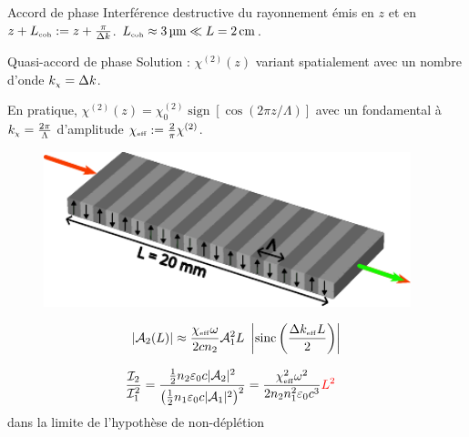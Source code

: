 \documentclass{beamer}
\newcommand{\chie}{\chi_\mathsc{eff}}
\newcommand{\dke}{\Delta k_\mathsc{eff}}
\begin{document}
\begin{frame}{Accord de phase}
Interférence destructive du rayonnement émis en $z$ et en  $z+L_{\mathrm{\scriptscriptstyle {coh}}} := z + \frac{\pi}{\Delta k}$. $L_{\mathrm{\scriptscriptstyle {coh}}} \approx \SI{3}{\micro\meter} \ll L = \SI{2}{cm}$.
\begin{figure}
\centering

\end{figure}
\end{frame}

\begin{frame}{Quasi-accord de phase}
Solution : $\chi^{(2)}(z)$ variant spatialement avec un nombre d'onde $k_{\mathrm{\scriptscriptstyle {\chi}}} = \Delta k$.
\pause

En pratique, $\chi^{(2)}(z) = \chi^{(2)}_0 \operatorname{sign}[\cos(2\pi z/ \Lambda)]$ avec un fondamental à $k_{\mathrm{\scriptscriptstyle {\chi}}} = \frac{2\pi}{\Lambda}$ d'amplitude $\chie := \frac2\pi \chi^{(2)}$.

\begin{figure}
\centering
\includegraphics[height=4.5cm]{./img/PP.pdf}
\end{figure}




\end{frame}

\begin{frame}
\begin{align*}
\left|\A_2(L)\right| \approx \frac{\chie\omega}{2 cn_2} \A_1^2 L\ \left|\operatorname{sinc}\left( \frac{\dke L}{2} \right)\right|
\end{align*}
\begin{figure}
\centering

\end{figure}
\end{frame}

\begin{frame}
\centering
\begin{align*}
\frac{\mathcal I_2}{\mathcal I_1^2} &= \frac{\frac12 n_2 \varepsilon_0 c |\mathcal{A}_2|^2}{\left(\frac12 n_1 \varepsilon_0 c |\mathcal{A}_1|^2\right)^2} 
	= \frac{\chi_{\mathrm{\scriptscriptstyle {eff}}}^2\omega^2}{2 n_2 n_1^2 \varepsilon_0 c^3} \color{red} L^2
\end{align*}
dans la limite de l'hypothèse de non-déplétion
\end{frame}
\end{document}
